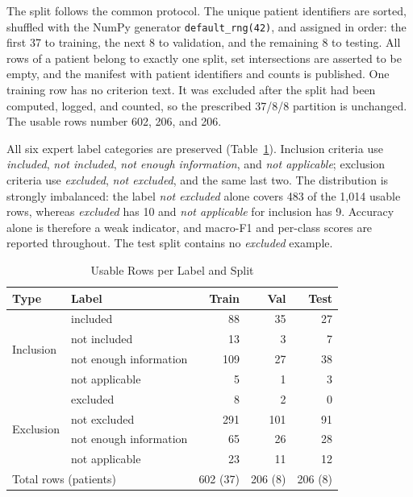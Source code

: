 \documentclass[conference]{IEEEtran}
\begin{document}
The split follows the common protocol. The unique patient identifiers are sorted, shuffled with the NumPy generator \texttt{default\_rng(42)}, and assigned in order: the first 37 to training, the next 8 to validation, and the remaining 8 to testing. All rows of a patient belong to exactly one split, set intersections are asserted to be empty, and the manifest with patient identifiers and counts is published. One training row has no criterion text. It was excluded after the split had been computed, logged, and counted, so the prescribed 37/8/8 partition is unchanged. The usable rows number 602, 206, and 206.

All six expert label categories are preserved (Table~\ref{tab:labels}). Inclusion criteria use \emph{included}, \emph{not included}, \emph{not enough information}, and \emph{not applicable}; exclusion criteria use \emph{excluded}, \emph{not excluded}, and the same last two. The distribution is strongly imbalanced: the label \emph{not excluded} alone covers 483 of the 1,014 usable rows, whereas \emph{excluded} has 10 and \emph{not applicable} for inclusion has 9. Accuracy alone is therefore a weak indicator, and macro-F1 and per-class scores are reported throughout. The test split contains no \emph{excluded} example.

\begin{table}[!t]
\caption{Usable Rows per Label and Split}
\label{tab:labels}
\centering
\footnotesize
\begin{tabular}{llrrr}
\toprule
Type & Label & Train & Val & Test \\
\midrule
\multirow{4}{*}{Inclusion} & included & 88 & 35 & 27 \\
 & not included & 13 & 3 & 7 \\
 & not enough information & 109 & 27 & 38 \\
 & not applicable & 5 & 1 & 3 \\
\midrule
\multirow{4}{*}{Exclusion} & excluded & 8 & 2 & 0 \\
 & not excluded & 291 & 101 & 91 \\
 & not enough information & 65 & 26 & 28 \\
 & not applicable & 23 & 11 & 12 \\
\midrule
\multicolumn{2}{l}{Total rows (patients)} & 602 (37) & 206 (8) & 206 (8) \\
\bottomrule
\end{tabular}
\end{table}
\end{document}
